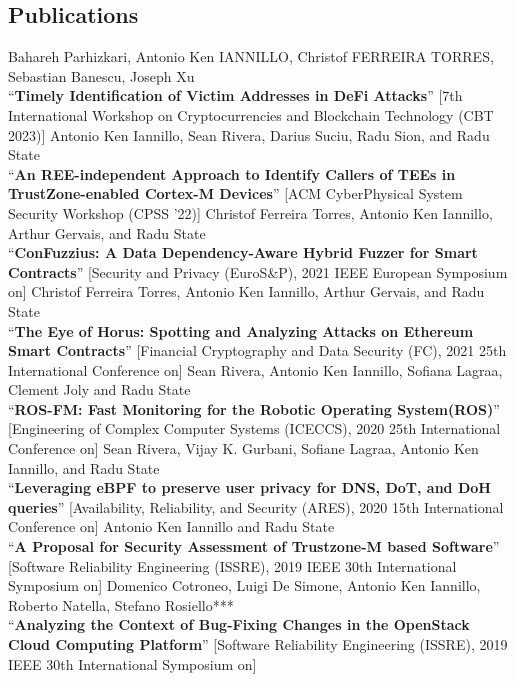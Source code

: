 \documentclass[margin,line]{resume}
\begin{document}
\begin{resume}
\filbreak
\section{\mysidestyle Publications}

\filbreak
Bahareh Parhizkari, Antonio Ken IANNILLO, Christof FERREIRA TORRES, Sebastian Banescu, Joseph Xu\\
``\textbf{Timely Identification of Victim Addresses in DeFi Attacks}''
[7th International Workshop on Cryptocurrencies and Blockchain Technology (CBT 2023)]
\filbreak
Antonio Ken Iannillo, Sean Rivera, Darius Suciu, Radu Sion, and Radu State\\
``\textbf{An REE-independent Approach to Identify Callers of TEEs in TrustZone-enabled Cortex-M Devices}''
[ACM CyberPhysical System Security Workshop (CPSS ’22)]
\filbreak
Christof Ferreira Torres, Antonio Ken Iannillo, Arthur Gervais, and Radu State\\
``\textbf{ConFuzzius: A Data Dependency-Aware Hybrid Fuzzer for Smart Contracts}''
[Security and Privacy (EuroS\&P), 2021 IEEE European Symposium on]
\filbreak
Christof Ferreira Torres, Antonio Ken Iannillo, Arthur Gervais, and Radu State\\
``\textbf{The Eye of Horus: Spotting and Analyzing Attacks on Ethereum Smart Contracts}''
[Financial Cryptography and Data Security (FC), 2021 25th International Conference on]
\filbreak
Sean Rivera, Antonio Ken Iannillo, Sofiana Lagraa, Clement Joly and Radu State\\
``\textbf{ROS-FM: Fast Monitoring for the Robotic Operating System(ROS)}''
[Engineering of Complex Computer Systems (ICECCS), 2020 25th International Conference on]
\filbreak
Sean Rivera, Vijay K. Gurbani, Sofiane Lagraa, Antonio Ken Iannillo, and Radu State\\
``\textbf{Leveraging eBPF to preserve user privacy for DNS, DoT, and DoH queries}''
[Availability, Reliability, and Security (ARES), 2020 15th International Conference on]
\filbreak
Antonio Ken Iannillo and Radu State\\
``\textbf{A Proposal for Security Assessment of Trustzone-M based Software}''
[Software Reliability Engineering (ISSRE), 2019 IEEE 30th International Symposium on]
\filbreak
Domenico Cotroneo, Luigi De Simone, Antonio Ken Iannillo, Roberto Natella, Stefano Rosiello***\\
``\textbf{Analyzing the Context of Bug-Fixing Changes in the OpenStack Cloud Computing Platform}''
[Software Reliability Engineering (ISSRE), 2019 IEEE 30th International Symposium on]

\end{resume}
\end{document}
